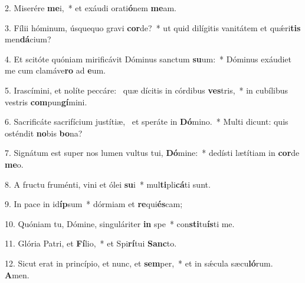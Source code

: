 2. Miserére \textbf{me}i,~*  et exáudi orati\textbf{ó}nem \textbf{me}am.\

3. Fílii hóminum, úsquequo gravi \textbf{cor}de?~*  ut quid dilígitis vanitátem et quǽri\textbf{tis} men\textbf{dá}cium?\

4. Et scitóte quóniam mirificávit Dóminus sanctum \textbf{su}um:~*  Dóminus exáudiet me cum clamáve\textbf{ro} ad \textbf{e}um.\

5. Irascímini, et nolíte peccáre: \dag\  quæ dícitis in córdibus \textbf{ves}tris,~*  in cubílibus vestris \textbf{com}pun\textbf{gí}mini.\

6. Sacrificáte sacrifícium justítiæ, \dag\  et speráte in \textbf{Dó}mino.~*  Multi dicunt: quis osténdit \textbf{no}bis \textbf{bo}na?\

7. Signátum est super nos lumen vultus tui, \textbf{Dó}mine:~*  dedísti lætítiam in \textbf{cor}de \textbf{me}o.\

8. A fructu fruménti, vini et ólei \textbf{su}i~*  mul\textbf{ti}pli\textbf{cá}ti sunt.\

9. In pace in id\textbf{íp}sum~*  dórmiam et \textbf{re}qui\textbf{és}cam;\

10. Quóniam tu, Dómine, singuláriter \textbf{in} spe~*  con\textbf{sti}tu\textbf{ís}ti me.\

11. Glória Patri, et \textbf{Fí}lio,~*  et Spi\textbf{rí}tui \textbf{Sanc}to.\

12. Sicut erat in princípio, et nunc, et \textbf{sem}per,~*  et in sǽcula sæcu\textbf{ló}rum. \textbf{A}men.\

